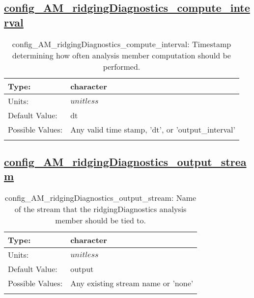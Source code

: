 \subsection[config\_AM\_ridgingDiagnostics\_compute\_interval]{\hyperref[sec:nm_tab_AM_ridgingDiagnostics]{config\_AM\_ridgingDiagnostics\_compute\_interval}}
\label{subsec:nm_sec_config_AM_ridgingDiagnostics_compute_interval}
\begin{center}
\begin{longtable}{| p{2.0in} || p{4.0in} |}
    \hline
    Type: & character \\
    \hline
    Units: & $unitless$ \\
    \hline
    Default Value: & dt \\
    \hline
    Possible Values: & Any valid time stamp, 'dt', or 'output\_interval' \\
    \hline
    \caption{config\_AM\_ridgingDiagnostics\_compute\_interval: Timestamp determining how often analysis member computation should be performed.}
\end{longtable}
\end{center}
\subsection[config\_AM\_ridgingDiagnostics\_output\_stream]{\hyperref[sec:nm_tab_AM_ridgingDiagnostics]{config\_AM\_ridgingDiagnostics\_output\_stream}}
\label{subsec:nm_sec_config_AM_ridgingDiagnostics_output_stream}
\begin{center}
\begin{longtable}{| p{2.0in} || p{4.0in} |}
    \hline
    Type: & character \\
    \hline
    Units: & $unitless$ \\
    \hline
    Default Value: & output \\
    \hline
    Possible Values: & Any existing stream name or 'none' \\
    \hline
    \caption{config\_AM\_ridgingDiagnostics\_output\_stream: Name of the stream that the ridgingDiagnostics analysis member should be tied to.}
\end{longtable}
\end{center}
